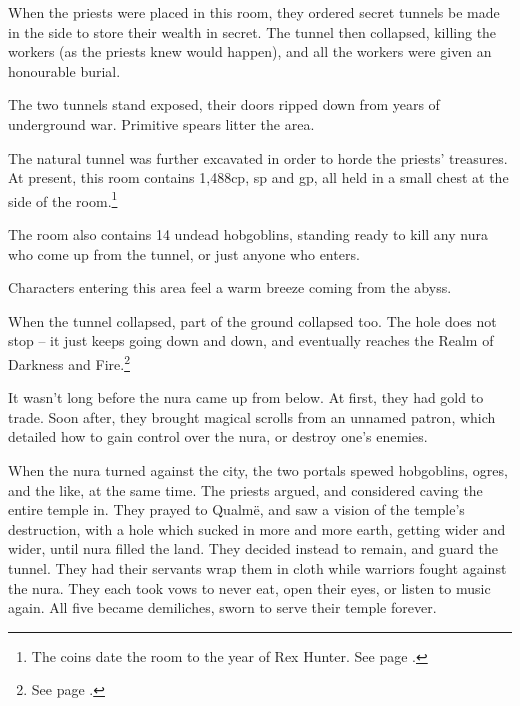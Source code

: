 \begin{multicols}{2}
\begin{exampletext}
When the priests were placed in this room, they ordered secret tunnels be made in the side to store their wealth in secret.
The tunnel then collapsed, killing the workers (as the priests knew would happen), and all the workers were given an honourable burial.

\end{exampletext}

The two tunnels stand exposed, their doors ripped down from years of underground war.  Primitive spears litter the area.


The natural tunnel was further excavated in order to horde the priests' treasures.
At present, this room contains 1,488cp, \thepage sp and  gp, all held in a small chest at the side of the room.\footnote{The coins date the room to the year of Rex Hunter.
See page \pageref{r_hunter}.}

The room also contains 14 undead hobgoblins, standing ready to kill any nura who come up from the tunnel, or just anyone who enters.



Characters entering this area feel a warm breeze coming from the abyss.

\begin{exampletext}

When the tunnel collapsed, part of the ground collapsed too.  The hole does not stop -- it just keeps going down and down, and eventually reaches the Realm of Darkness and Fire.\footnote{See page \pageref{darknessandfire}.}

It wasn't long before the nura came up from below.  At first, they had gold to trade.  Soon after, they brought magical scrolls from an unnamed patron, which detailed how to gain control over the nura, or destroy one's enemies.

When the nura turned against the city, the two portals spewed hobgoblins, ogres, and the like, at the same time.
The priests argued, and considered caving the entire temple in.
They prayed to Qualm\"{e}, and saw a vision of the temple's destruction, with a hole which sucked in more and more earth, getting wider and wider, until nura filled the land.
They decided instead to remain, and guard the tunnel.
They had their servants wrap them in cloth while warriors fought against the nura.
They each took vows to never eat, open their eyes, or listen to music again.
All five became demiliches, sworn to serve their temple forever.


\end{exampletext}
\end{multicols}
